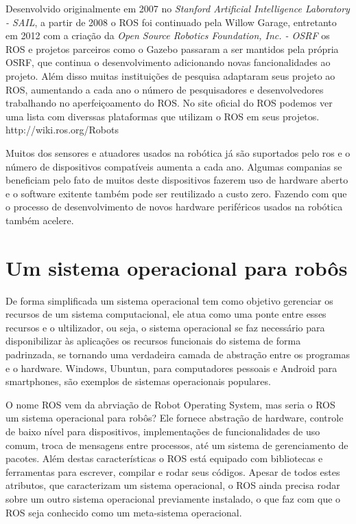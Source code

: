Desenvolvido originalmente em 2007 no \textit{Stanford Artificial Intelligence Laboratory - SAIL},
a partir de 2008 o ROS foi continuado pela Willow Garage, entretanto em 2012 com a criação 
da \textit{Open Source Robotics Foundation, Inc. - OSRF} os ROS e projetos parceiros como o 
Gazebo passaram a ser mantidos pela própria OSRF, que continua o desenvolvimento adicionando novas
fancionalidades ao projeto. Além disso muitas instituições de pesquisa adaptaram seus projeto
ao ROS, aumentando a cada ano o número de pesquisadores e desenvolvedores trabalhando no 
aperfeiçoamento do ROS. No site oficial do ROS podemos ver uma lista com diverssas plataformas 
que utilizam o ROS em seus projetos. http://wiki.ros.org/Robots

Muitos dos sensores e atuadores usados na robótica já são suportados pelo ros e o número de 
dispositivos compatíveis aumenta a cada ano. Algumas companias se beneficiam pelo fato de 
muitos deste dispositivos fazerem uso de hardware aberto e o software exitente também pode ser
reutilizado a custo zero. Fazendo com que o processo de desenvolvimento de novos hardware 
periféricos usados na robótica também acelere.




\section{Um sistema operacional para robôs}

De forma simplificada um sistema operacional tem como objetivo gerenciar os recursos de um 
sistema computacional, ele atua como uma ponte entre esses recursos e o ultilizador, ou seja, 
o sistema operacional se faz necessário para disponibilizar às aplicações os recursos 
funcionais do sistema de forma padrinzada, se tornando uma verdadeira camada de abstração 
entre os programas e o hardware. Windows, Ubuntun, para computadores pessoais e Android para
smartphones, são exemplos de sistemas operacionais populares.

O nome ROS vem da abrviação de Robot Operating System, mas seria o ROS um sistema operacional
para robôs? Ele fornece abstração de hardware, controle de baixo nível para dispositivos, 
implementações de funcionalidades de uso comum, troca de mensagens entre processos, até 
um sistema de gerenciamento de pacotes. Além destas características o ROS está equipado com 
bibliotecas e ferramentas para escrever, compilar e rodar seus códigos. %
Apesar de todos estes atributos, que caracterizam um sistema operacional, o ROS
ainda precisa rodar sobre um outro sistema operacional previamente instalado, o que faz com 
que o ROS seja conhecido como um meta-sistema operacional.

